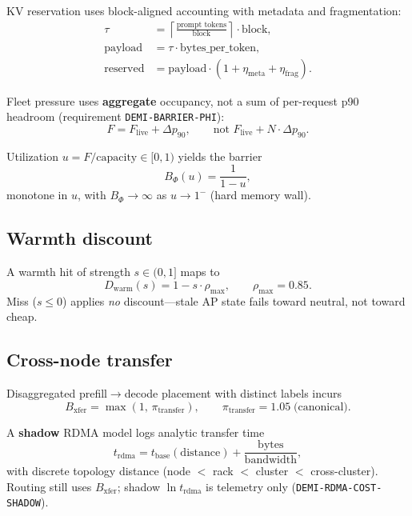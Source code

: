 \documentclass[11pt,a4paper]{article}
\begin{document}
KV reservation uses block-aligned accounting with metadata and fragmentation:
\begin{align*}
  \tau &= \left\lceil \frac{\text{prompt tokens}}{\text{block}} \right\rceil \cdot \text{block}, \\
  \text{payload} &= \tau \cdot \text{bytes\_per\_token}, \\
  \text{reserved} &= \text{payload} \cdot (1 + \eta_{\mathrm{meta}} + \eta_{\mathrm{frag}}).
\end{align*}

Fleet pressure uses \textbf{aggregate} occupancy, not a sum of per-request
p90 headroom (requirement \texttt{DEMI-BARRIER-PHI}):
\[
  F = F_{\mathrm{live}} + \Delta p_{90},
  \qquad
  \text{not } F_{\mathrm{live}} + N \cdot \Delta p_{90}.
\]

Utilization $u = F / \text{capacity} \in [0,1)$ yields the barrier
\begin{equation}\label{eq:phi}
  B_\Phi(u) = \frac{1}{1-u},
\end{equation}
monotone in $u$, with $B_\Phi \to \infty$ as $u \to 1^{-}$ (hard memory wall).

\subsection{Warmth discount}

A warmth hit of strength $s \in (0,1]$ maps to
\begin{equation}
  D_{\mathrm{warm}}(s) = 1 - s \cdot \rho_{\max},
  \qquad
  \rho_{\max} = 0.85.
\end{equation}
Miss ($s \le 0$) applies \emph{no} discount---stale AP state fails toward
neutral, not toward cheap.

\subsection{Cross-node transfer}

Disaggregated prefill$\to$decode placement with distinct labels incurs
\begin{equation}
  B_{\mathrm{xfer}} = \max(1,\, \pi_{\mathrm{transfer}}),
  \qquad
  \pi_{\mathrm{transfer}} = 1.05 \;\text{(canonical)}.
\end{equation}

A \textbf{shadow} RDMA model logs analytic transfer time
\[
  t_{\mathrm{rdma}} = t_{\mathrm{base}}(\mathrm{distance}) + \frac{\text{bytes}}{\text{bandwidth}},
\]
with discrete topology distance (node $<$ rack $<$ cluster $<$ cross-cluster).
Routing still uses $B_{\mathrm{xfer}}$; shadow $\ln t_{\mathrm{rdma}}$ is
telemetry only (\texttt{DEMI-RDMA-COST-SHADOW}).
\end{document}
